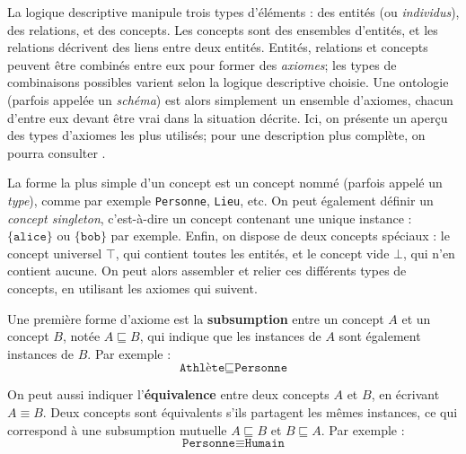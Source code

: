 


La logique descriptive manipule trois types d'éléments : des entités (ou \textit{individus}), des relations, et des concepts. Les concepts sont des ensembles d'entités, et les relations décrivent des liens entre deux entités. Entités, relations et concepts peuvent être combinés entre eux pour former des \textit{axiomes}; les types de combinaisons possibles varient selon la logique descriptive choisie. Une ontologie (parfois appelée un \textit{schéma}) est alors simplement un ensemble d'axiomes, chacun d'entre eux devant être vrai dans la situation décrite.
Ici, on présente un aperçu des types d'axiomes les plus utilisés; %
pour une description plus complète, on pourra consulter \cite{krotzsch2013description}. %


La forme la plus simple d'un concept est un concept nommé (parfois appelé un \textit{type}), comme par exemple \texttt{Personne}, \texttt{Lieu}, etc. On peut également définir un \textit{concept singleton}, c'est-à-dire un concept contenant une unique instance : $\{ \texttt{alice} \}$ ou $\{ \texttt{bob} \}$ par exemple. Enfin, on dispose de deux concepts spéciaux : le concept universel $\top$, qui contient toutes les entités, et le concept vide $\bot$, qui n'en contient aucune. On peut alors assembler et relier ces différents types de concepts, en utilisant les axiomes qui suivent.

Une première forme d'axiome est la \textbf{subsumption} entre un concept $A$ et un concept $B$, notée $A \sqsubseteq B$, qui indique que les instances de $A$ sont également instances de $B$. Par exemple :
\begin{equation}
    \texttt{Athlète} \sqsubseteq \texttt{Personne}
\end{equation}

On peut aussi indiquer l'\textbf{équivalence} entre deux concepts $A$ et $B$, en écrivant $A \equiv B$. Deux concepts sont équivalents s'ils partagent les mêmes instances, ce qui correspond à une subsumption mutuelle $A \sqsubseteq B$ et $B \sqsubseteq A$. Par exemple :
\begin{equation}
    \texttt{Personne} \equiv \texttt{Humain}
\end{equation}

